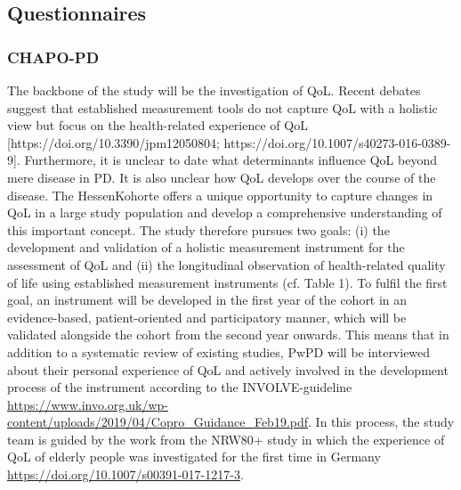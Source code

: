 \subsection{Questionnaires}
\label{subsec:questionnaires}
\subsubsection{\acl{CHAPO-PD}}
\label{questionnaires:chapo}
The backbone of the study will be the investigation of QoL. Recent debates suggest that established measurement tools do not capture QoL with a holistic view but focus on the health-related experience of QoL [https://doi.org/10.3390/jpm12050804; https://doi.org/10.1007/s40273-016-0389-9]. Furthermore, it is unclear to date what determinants influence QoL beyond mere disease in PD. It is also unclear how QoL develops over the course of the disease. The HessenKohorte offers a unique opportunity to capture changes in QoL in a large study population and develop a comprehensive understanding of this important concept. The study therefore pursues two goals: (i) the development and validation of a holistic measurement instrument for the assessment of QoL and (ii) the longitudinal observation of health-related quality of life using established measurement instruments (cf. Table 1). 
To fulfil the first goal, an instrument will be developed in the first year of the cohort in an evidence-based, patient-oriented and participatory manner, which will be validated alongside the cohort from the second year onwards.  This means that in addition to a systematic review of existing studies, PwPD will be interviewed about their personal experience of QoL and actively involved in the development process of the instrument according to the INVOLVE-guideline \url{https://www.invo.org.uk/wp-content/uploads/2019/04/Copro_Guidance_Feb19.pdf}. In this process, the study team is guided by the work from the NRW80+ study in which the experience of QoL of elderly people was investigated for the first time in Germany \url{https://doi.org/10.1007/s00391-017-1217-3}.


